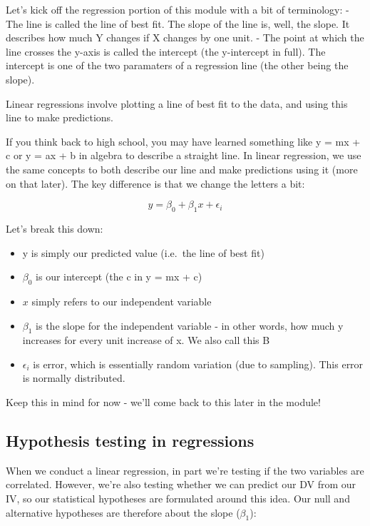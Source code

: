 \documentclass[
]{book}
\providecommand{\tightlist}{%
  \setlength{\itemsep}{0pt}\setlength{\parskip}{0pt}}
\begin{document}
Let's kick off the regression portion of this module with a bit of terminology:
- The line is called the line of best fit. The slope of the line is, well, the slope. It describes how much Y changes if X changes by one unit.
- The point at which the line crosses the y-axis is called the intercept (the y-intercept in full). The intercept is one of the two paramaters of a regression line (the other being the slope).

Linear regressions involve plotting a line of best fit to the data, and using this line to make predictions.

If you think back to high school, you may have learned something like y = mx + c or y = ax + b in algebra to describe a straight line. In linear regression, we use the same concepts to both describe our line and make predictions using it (more on that later). The key difference is that we change the letters a bit:

\[
y = \beta_0 + \beta_1x + \epsilon_i
\]

Let's break this down:

\begin{itemize}
\tightlist
\item
  y is simply our predicted value (i.e.~the line of best fit)
\item
  \(\beta_0\) is our intercept (the c in y = mx + c)
\item
  \(x\) simply refers to our independent variable
\item
  \(\beta_1\) is the slope for the independent variable - in other words, how much y increases for every unit increase of x. We also call this B
\item
  \(\epsilon_i\) is error, which is essentially random variation (due to sampling). This error is normally distributed.
\end{itemize}

Keep this in mind for now - we'll come back to this later in the module!

\hypertarget{hypothesis-testing-in-regressions}{%
\subsection{Hypothesis testing in regressions}\label{hypothesis-testing-in-regressions}}

When we conduct a linear regression, in part we're testing if the two variables are correlated. However, we're also testing whether we can predict our DV from our IV, so our statistical hypotheses are formulated around this idea. Our null and alternative hypotheses are therefore about the slope (\(\beta_1\)):
\end{document}

